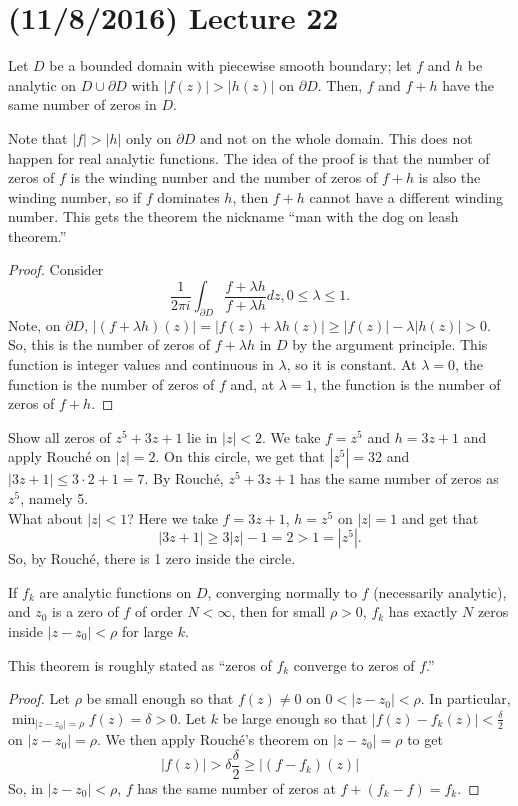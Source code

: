 \documentclass[11pt,leqno,oneside]{amsart}
\begin{document}
  \section{(11/8/2016) Lecture 22}
  \begin{thm}
    Let $D$ be a bounded domain with piecewise smooth boundary; let
    $f$ and $h$ be analytic on $D \cup \partial D$ with $|f(z)| >
    |h(z)|$ on $\partial D$. Then, $f$ and $f+h$ have the same number
    of zeros in $D$. 
  \end{thm}
  Note that $|f| > |h|$ only on $\partial D$ and not on the whole
  domain. This does not happen for real analytic functions. The idea
  of the proof is that the number of zeros of $f$ is the winding
  number and the number of zeros of $f+h$ is also the winding number,
  so if $f$ dominates $h$, then $f+h$ cannot have a different winding
  number. This gets the theorem the nickname ``man with the dog on
  leash theorem.''
  \begin{proof}
    Consider \[
      \frac{1}{2\pi i} \int_{\partial D} \frac{f+\lambda h}{f +
        \lambda h} dz, 0 \leq \lambda \leq 1.
    \]
    Note, on $\partial D$, $|(f+\lambda h)(z)| = |f(z) + \lambda h(z)|
    \geq |f(z)| - \lambda |h(z)| > 0$. So, this is the number of zeros
    of $f+\lambda h$ in $D$ by the argument principle. This function
    is integer values and continuous in $\lambda$, so it is
    constant. At $\lambda = 0$, the function is the number of zeros of
    $f$ and, at $\lambda = 1$, the function is the number of zeros of
    $f+h$. 
  \end{proof}
  \begin{example}
    Show all zeros of $z^5+3z+1$ lie in $|z| < 2$. We take $f=z^5$ and
    $h=3z+1$ and apply Rouch\'{e} on $|z| = 2$. On this circle, we
    get that $|z^5| = 32$ and $|3z+1| \leq 3\cdot 2 + 1 = 7$. By
    Rouch\'{e}, $z^5+3z+1$ has the same number of zeros as $z^5$,
    namely 5. \\

    What about $|z|<1$? Here we take $f = 3z+1$, $h = z^5$ on $|z|=1$
    and get that \[
      |3z+1| \geq 3|z|-1 = 2 > 1 = |z^5|.
    \]
    So, by Rouch\'{e}, there is 1 zero inside the circle.
  \end{example}
  \begin{thm}
    If $f_k$ are analytic functions on $D$, converging normally to
    $f$ (necessarily analytic), and $z_0$ is a zero of $f$ of order $N
    < \infty$, then for small $\rho > 0$, $f_k$ has exactly $N$ zeros
    inside $|z-z_0| < \rho$ for large $k$. 
  \end{thm}
  This theorem is roughly stated as ``zeros of $f_k$ converge to zeros
  of $f$.''
  \begin{proof}
    Let $\rho$ be small enough so that $f(z) \neq 0$ on $0 < |z-z_0| <
    \rho$. In particular, $\min_{|z-z_0|=\rho} f(z) = \delta > 0$. Let $k$ be large
    enough so that $|f(z) - f_k(z)| < \frac{\delta}{2}$ on $|z-z_0| =
    \rho$. We then apply Rouch\'{e}'s theorem on $|z-z_0| = \rho$ to
    get \[
      |f(z)| > \delta \frac{\delta}{2} \geq |(f-f_k)(z)|
   \]
   So, in $|z-z_0| < \rho$, $f$ has the same number of zeros at
   $f+(f_k-f) = f_k$. 
  \end{proof}
\end{document}
